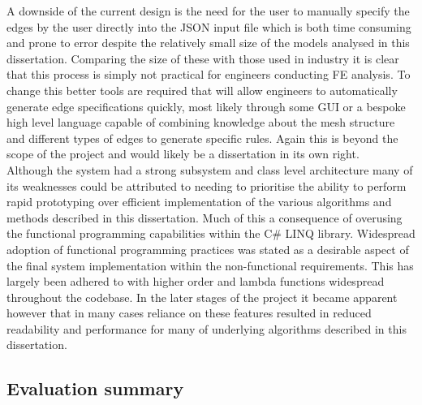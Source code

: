 \noindent
A downside of the current design is the need for the user to manually specify the edges by the user directly into the JSON input file which is both time consuming and prone to error despite the relatively small size of the models analysed in this dissertation. Comparing the size of these with those used in industry it is clear that this process is simply not practical for engineers conducting FE analysis. To change this better tools are required that will allow engineers to automatically generate edge specifications quickly, most likely through some GUI or a bespoke high level language capable of combining knowledge about the mesh structure and different types of edges to generate specific rules. Again this is beyond the scope of the project and would likely be a dissertation in its own right. \\


\noindent
Although the system had a strong subsystem and class level architecture many of its weaknesses could be attributed to needing to prioritise the ability to perform rapid prototyping over efficient implementation of the various algorithms and methods described in this dissertation. Much of this a consequence of overusing the functional programming capabilities within the C\# LINQ library. Widespread adoption of functional programming practices was stated as a desirable aspect of the final system implementation within the non-functional requirements. This has largely been adhered to with  higher order and lambda functions widespread throughout the codebase. In the later stages of the project it became apparent however that in many cases reliance on these features resulted in reduced readability and performance for many of underlying algorithms described in this dissertation. \\




\subsection{Evaluation summary}
